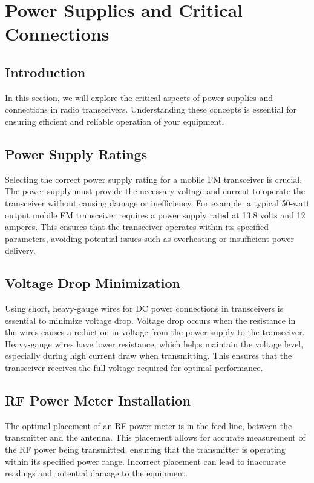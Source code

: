 \section{Power Supplies and Critical Connections}
\label{section:power_and_connections}

\subsection*{Introduction}
In this section, we will explore the critical aspects of power supplies and connections in radio transceivers. Understanding these concepts is essential for ensuring efficient and reliable operation of your equipment.

\subsection*{Power Supply Ratings}
Selecting the correct power supply rating for a mobile FM transceiver is crucial. The power supply must provide the necessary voltage and current to operate the transceiver without causing damage or inefficiency. For example, a typical 50-watt output mobile FM transceiver requires a power supply rated at 13.8 volts and 12 amperes. This ensures that the transceiver operates within its specified parameters, avoiding potential issues such as overheating or insufficient power delivery.

\subsection*{Voltage Drop Minimization}
Using short, heavy-gauge wires for DC power connections in transceivers is essential to minimize voltage drop. Voltage drop occurs when the resistance in the wires causes a reduction in voltage from the power supply to the transceiver. Heavy-gauge wires have lower resistance, which helps maintain the voltage level, especially during high current draw when transmitting. This ensures that the transceiver receives the full voltage required for optimal performance.

\subsection*{RF Power Meter Installation}
The optimal placement of an RF power meter is in the feed line, between the transmitter and the antenna. This placement allows for accurate measurement of the RF power being transmitted, ensuring that the transmitter is operating within its specified power range. Incorrect placement can lead to inaccurate readings and potential damage to the equipment.

